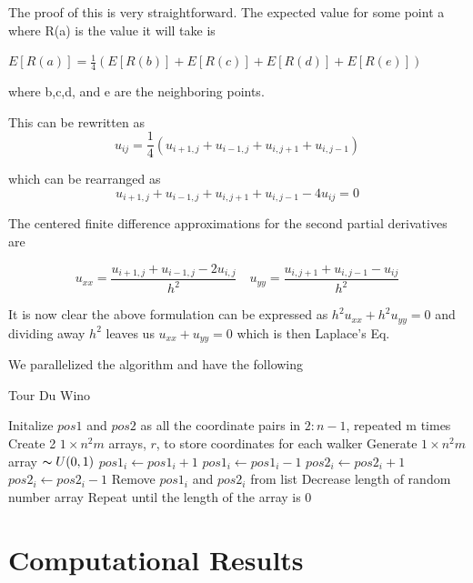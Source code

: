 \documentclass{amsart}
\begin{document}
The proof of this is very straightforward. The expected value for some point a where R(a) is the value it will take is

$ E[R(a)] = \frac{1}{4} (E[R(b)] + E[R(c)] + E[R(d)] + E[R(e)]  )$

where b,c,d, and e are the neighboring points.

This can be rewritten as
\begin{equation}
u_{ij} = \frac{1}{4} (u_{i+1,j} + u_{i-1,j} + u_{i,j+1} + u_{i,j-1})
\end{equation}

which can be rearranged as
\begin{equation*}
u_{i+1,j} + u_{i-1,j} + u_{i,j+1} + u_{i,j-1} - 4u_{ij} = 0
\end{equation*}

The centered finite difference approximations for the second partial derivatives are

\begin{equation*} 
	u_{xx} = \frac{u_{i+1,j} + u_{i-1,j} - 2u_{i,j}}{h^2} \quad u_{yy} = \frac{u_{i,j+1} + u_{i,j-1} - u_{ij}}{h^2}
\end{equation*}

It is now clear the above formulation can be expressed as $h^2 u_{xx} + h^2 u_{yy} = 0$ and dividing away $h^2$ leaves us $u_{xx} + u_{yy} = 0$ which is then Laplace's Eq.

We parallelized the algorithm and have the following
\begin{algorithm}
	\caption{Tour Du Wino}
	\begin{algorithmic}[1]
		\State Initalize $pos1$ and $pos2$ as all the coordinate pairs in $2:n-1$, repeated m  times
		\State Create 2 $1 \times n^2m$ arrays, $r$, to store coordinates for each walker
		\State Generate $1 \times n^2m$ array $\thicksim U(0,1)$
			\State $pos1_i \gets pos1_i + 1$
			\State $pos1_i \gets pos1_i - 1$
			\State $pos2_i \gets pos2_i + 1$
		\Else
			\State $pos2_i \gets pos2_i - 1$
		\EndIf
			\State Remove $pos1_i$ and $pos2_i$ from list
			\State Decrease length of random number array
		\EndIf
		\State Repeat until the length of the array is 0
	\end{algorithmic}
\end{algorithm}

\section{Computational Results}
\end{document}
